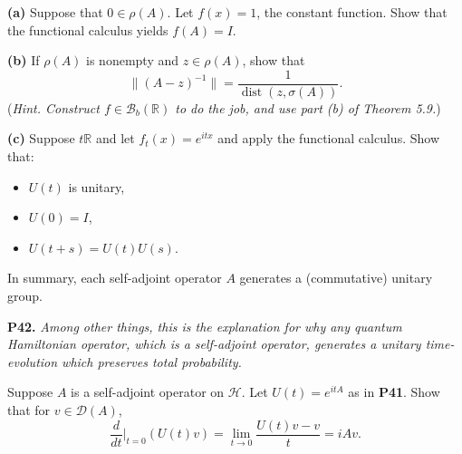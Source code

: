 \documentclass[12pt]{amsart}
\newcommand{\cB}{\mathcal{B}}
\newcommand{\cD}{\mathcal{D}}
\newcommand{\cH}{\mathcal{H}}
\newcommand{\RR}{\mathbb{R}}
\newcommand{\prob}[1]{\bigskip\noindent\textbf{#1.}\quad }
\newcommand{\epart}[1]{\medskip\noindent\textbf{(#1)}\quad }
\begin{document}
\epart{a}  Suppose that $0\in\rho(A)$.  Let $f(x)=1$, the constant function.  Show that the functional calculus yields $f(A)=I$.

\epart{b}  If $\rho(A)$ is nonempty and $z\in\rho(A)$, show that
	$$\|(A-z)^{-1}\| = \frac{1}{\operatorname{dist}(z,\sigma(A))}.$$
(\emph{Hint. Construct $f\in\cB_b(\RR)$ to do the job, and use part (b) of Theorem 5.9.})

\epart{c}  Suppose $t\RR$ and let $f_t(x) = e^{itx}$ and apply the functional calculus.  Show that:
\begin{itemize}
\item $U(t)$ is unitary,
\item $U(0) = I$,
\item $U(t+s) = U(t) U(s)$.
\end{itemize}
In summary, each self-adjoint operator $A$ generates a (commutative) unitary group.


\prob{P42}  \emph{Among other things, this is the explanation for why any quantum Hamiltonian operator, which is a self-adjoint operator, generates a unitary time-evolution which preserves total probability.}

\medskip\noindent Suppose $A$ is a self-adjoint operator on $\cH$.  Let $U(t) = e^{itA}$ as in \textbf{P41}.  Show that for $v\in\cD(A)$,
	$$\frac{d}{dt}\Big|_{t=0} (U(t)v) = \lim_{t\to 0} \frac{U(t)v-v}{t} = i A v.$$
\end{document}
